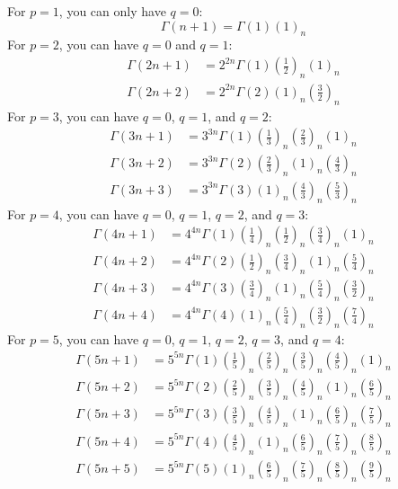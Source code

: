 For $p = 1$, you can only have $q = 0$:
\begin{equation}
	\Gamma(n+1) = \Gamma(1) (1)_{n}
\end{equation}
For $p = 2$, you can have $q = 0$ and $q = 1$:
\begin{align}
	\Gamma(2n+1) & = 2^{2n} \Gamma(1) \left(\frac{1}{2}\right)_{n} (1)_{n} \\
	\Gamma(2n+2) & = 2^{2n} \Gamma(2) (1)_{n} \left(\frac{3}{2}\right)_{n}
\end{align}
For $p = 3$, you can have $q = 0$, $q = 1$, and $q = 2$:
\begin{align}
	\Gamma(3n+1) & = 3^{3n} \Gamma(1) \left(\frac{1}{3}\right)_{n} \left(\frac{2}{3}\right)_{n} \left(1\right)_{n} \\
	\Gamma(3n+2) & = 3^{3n} \Gamma(2) \left(\frac{2}{3}\right)_{n} \left(1\right)_{n} \left(\frac{4}{3}\right)_{n} \\
	\Gamma(3n+3) & = 3^{3n} \Gamma(3) \left(1\right)_{n} \left(\frac{4}{3}\right)_{n} \left(\frac{5}{3}\right)_{n}
\end{align}
For $p = 4$, you can have $q = 0$, $q = 1$, $q = 2$, and $q = 3$:
\begin{align}
	\Gamma(4n+1) & = 4^{4n} \Gamma(1) \left(\frac{1}{4}\right)_{n} \left(\frac{1}{2}\right)_{n} \left(\frac{3}{4}\right)_{n} \left(1\right)_{n} \\
	\Gamma(4n+2) & = 4^{4n} \Gamma(2) \left(\frac{1}{2}\right)_{n} \left(\frac{3}{4}\right)_{n} \left(1\right)_{n} \left(\frac{5}{4}\right)_{n} \\
	\Gamma(4n+3) & = 4^{4n} \Gamma(3) \left(\frac{3}{4}\right)_{n} \left(1\right)_{n} \left(\frac{5}{4}\right)_{n} \left(\frac{3}{2}\right)_{n} \\
	\Gamma(4n+4) & = 4^{4n} \Gamma(4) \left(1\right)_{n} \left(\frac{5}{4}\right)_{n} \left(\frac{3}{2}\right)_{n} \left(\frac{7}{4}\right)_{n}
\end{align}
For $p = 5$, you can have $q = 0$, $q = 1$, $q = 2$, $q = 3$, and $q = 4$:
\begin{align}
	\Gamma(5n+1) & = 5^{5n} \Gamma(1) \left(\frac{1}{5}\right)_{n} \left(\frac{2}{5}\right)_{n} \left(\frac{3}{5}\right)_{n} \left(\frac{4}{5}\right)_{n} \left(1\right)_{n} \\
	\Gamma(5n+2) & = 5^{5n} \Gamma(2) \left(\frac{2}{5}\right)_{n} \left(\frac{3}{5}\right)_{n} \left(\frac{4}{5}\right)_{n} \left(1\right)_{n} \left(\frac{6}{5}\right)_{n} \\
	\Gamma(5n+3) & = 5^{5n} \Gamma(3) \left(\frac{3}{5}\right)_{n} \left(\frac{4}{5}\right)_{n} \left(1\right)_{n} \left(\frac{6}{5}\right)_{n} \left(\frac{7}{5}\right)_{n} \\
    \Gamma(5n+4) & = 5^{5n} \Gamma(4) \left(\frac{4}{5}\right)_{n} \left(1\right)_{n} \left(\frac{6}{5}\right)_{n} \left(\frac{7}{5}\right)_{n} \left(\frac{8}{5}\right)_{n} \\
    \Gamma(5n+5) & = 5^{5n} \Gamma(5) \left(1\right)_{n} \left(\frac{6}{5}\right)_{n} \left(\frac{7}{5}\right)_{n} \left(\frac{8}{5}\right)_{n} \left(\frac{9}{5}\right)_{n}
\end{align}
